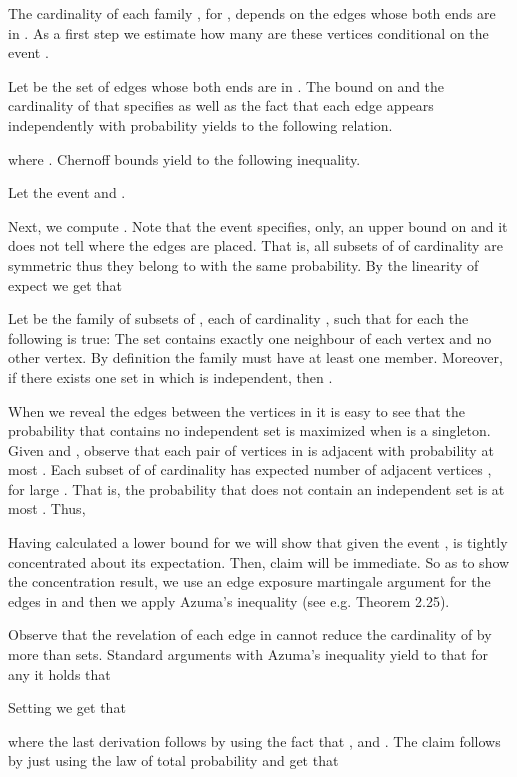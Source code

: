 \documentclass[a4paper,10pt]{article}
\makeatletter
\newenvironment{claimproof}[1]{\noindent{\bf Proof of Claim #1\@:}}{\hfill \\}
\makeatother
\begin{document}
\begin{claimproof}{\ref{claim:GoodFraction}}
The cardinality of each family , for ,
depends on the edges whose both ends are in . 
As a  first step we estimate how many are these vertices 
conditional on the event .

Let  be the set of edges whose both ends are in .
The bound on  and the cardinality of  that
 specifies as well as the fact that each edge appears
independently with probability  yields to the following relation.

where . Chernoff bounds yield to the following inequality.



\noindent
Let the event   and . 

Next, we compute .  Note that the event 
specifies, only, an upper bound on  and it does not tell
where the edges are placed. That is, all subsets of 
of cardinality  are symmetric thus they belong to 
with the same probability. By the linearity  of expect we get that


\noindent
Let  be the family of subsets of , each of 
cardinality , such that for each  the following
is true:  The set   contains  exactly one neighbour of
each vertex  and no other vertex. By definition the 
family  must have at least one member. Moreover, if there 
exists one set in  which is independent, then .  


When we reveal the edges between the vertices in 
it is easy to see that the probability that  contains no 
independent set is maximized when  is a singleton.
Given  and , observe that each pair of vertices in 
 is adjacent with probability  at most 
.  Each subset of  of cardinality 
has expected number of adjacent vertices ,
for large .  That is, the probability that  does not contain
an independent set is  at most . Thus, 


\noindent
Having calculated a lower bound for  we will show that
given the event ,   is tightly concentrated about its 
expectation. Then, claim will be immediate. So as to show the concentration
result,  we use an edge exposure martingale argument for the edges in  
and then we apply Azuma's inequality (see e.g. \cite{janson} Theorem 2.25). 


Observe that the revelation of each edge in  cannot reduce the
cardinality of  by more than 
sets. Standard arguments with Azuma's inequality  yield to that for any 
 it holds that

Setting  we get that

where the last derivation follows by using the fact that ,
 and . 
The claim follows by just using the law of total probability and get that

\end{claimproof}
\end{document}
